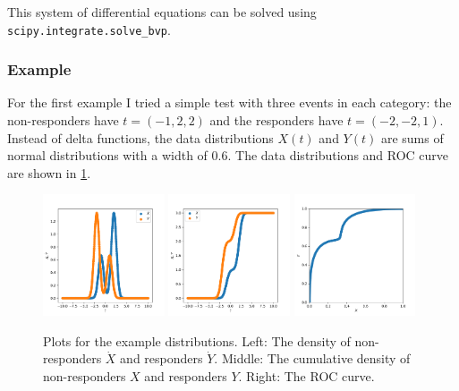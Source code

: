 \documentclass[11pt]{article}
\newcommand{\Xdot}{\dot{X}}
\newcommand{\Ydot}{\dot{Y}}
\begin{document}
This system of differential equations can be solved using \texttt{scipy.integrate.solve\_bvp}.

\subsubsection{Example}

For the first example I tried a simple test with three events in each category: the non-responders have \(t=\left(-1, 2, 2\right)\) and the responders have \(t=\left(-2, -2, 1\right)\).  Instead of delta functions, the data distributions \(X(t)\) and \(Y(t)\) are sums of normal distributions with a width of \(0.6\).  The data distributions and ROC curve are shown in \cref{fig:exampledata}.

\begin{figure}
\begin{center}
\includegraphics[width=0.32\textwidth]{exampleXdotYdot.pdf}
\includegraphics[width=0.32\textwidth]{exampleXY.pdf}
\includegraphics[width=0.32\textwidth]{exampleroc.pdf}
\caption{Plots for the example distributions.  Left: The density of non-responders \(\Xdot\) and responders \(\Ydot\).  Middle: The cumulative density of non-responders \(X\) and responders \(Y\).  Right: The ROC curve.}
\label{fig:exampledata}
\end{center}
\end{figure}
\end{document}
